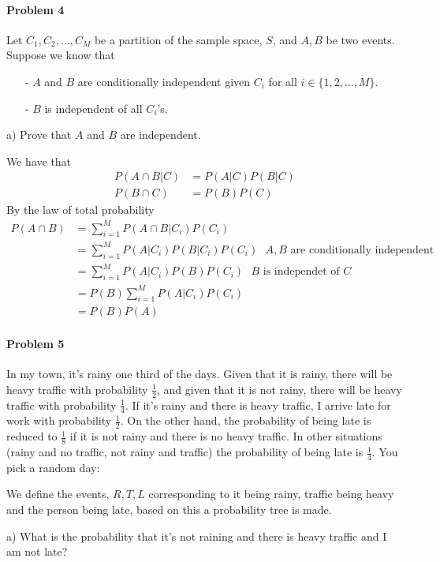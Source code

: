 \paragraph{Problem 4}
Let $C_{1},C_{2},\ldots,C_{M}$ be a partition of the sample space, $S$, and $A,B$ be two events. Suppose we know that
\begin{itemize}
    \item[-] $A$ and $B$ are conditionally independent given $C_{i}$ for all $i\in\{1,2,\ldots,M\}$.
    \item[-] $B$ is independent of all $C_{i}$'s.
\end{itemize}
a) Prove that $A$ and $B$ are independent.

We have that
\begin{align*}
    P(A\cap B|C)&=P(A|C)P(B|C) \\
    P(B\cap C)&=P(B)P(C)
\end{align*}
By the law of total probability
\begin{align*}
    P(A\cap B)&=\sum_{i=1}^{M}P(A\cap B|C_{i})P(C_{i}) \\ 
           &=\sum_{i=1}^{M}P(A|C_{i})P(B|C_{i})P(C_{i}) \text{ $A,B$ are conditionally independent} \\
           &=\sum_{i=1}^{M}P(A|C_{i})P(B)P(C_{i}) \text{ $B$ is independet of $C$ }\\
           &=P(B)\sum_{i=1}^{M}P(A|C_{i})P(C_{i}) \\
           &=P(B)P(A)
\end{align*}
\paragraph{Problem 5}
In my town, it's rainy one third of the days. Given that it is rainy, there will be heavy traffic with probability $\frac{1}{2}$, and given that it is not rainy, there will be heavy traffic with probability $\frac{1}{4}$. If it's rainy and there is heavy traffic, I arrive late for work with probability $\frac{1}{2}$. On the other hand, the probability of being late is reduced to $\frac{1}{8}$ if it is not rainy and there is no heavy traffic. In other situations (rainy and no traffic, not rainy and traffic) the probability of being late is $\frac{1}{4}$. You pick a random day:

We define the events, $R,T,L$ corresponding to it being rainy, traffic being heavy and the person being late, based on this a probability tree is made.

a) What is the probability that it's not raining and there is heavy traffic and I am not late?


